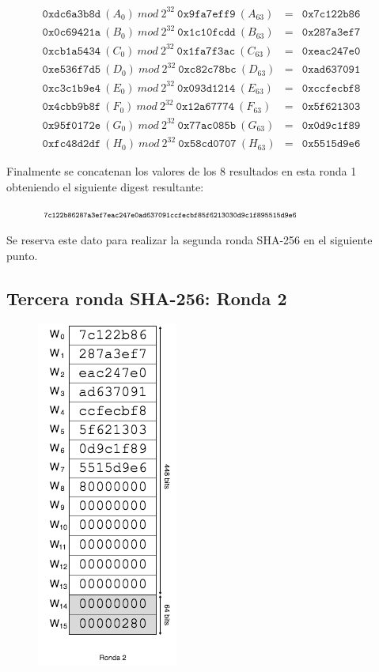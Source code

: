 \documentclass{article}
\begin{document}
    \begin{figure}[H]
    \centering
        $\begin{array}{lll}
            \texttt{0xdc6a3b8d}\ (A_0)\ mod\ 2^{32}\ \texttt{0x9fa7eff9}\ (A_63) & = & \texttt{0x7c122b86} \\
            \texttt{0x0c69421a}\ (B_0)\ mod\ 2^{32}\ \texttt{0x1c10fcdd}\ (B_63) & = & \texttt{0x287a3ef7} \\
            \texttt{0xcb1a5434}\ (C_0)\ mod\ 2^{32}\ \texttt{0x1fa7f3ac}\ (C_63) & = & \texttt{0xeac247e0} \\
            \texttt{0xe536f7d5}\ (D_0)\ mod\ 2^{32}\ \texttt{0xc82c78bc}\ (D_63) & = & \texttt{0xad637091} \\
            \texttt{0xc3c1b9e4}\ (E_0)\ mod\ 2^{32}\ \texttt{0x093d1214}\ (E_63) & = & \texttt{0xccfecbf8} \\
            \texttt{0x4cbb9b8f}\ (F_0)\ mod\ 2^{32}\ \texttt{0x12a67774}\ (F_63) & = & \texttt{0x5f621303} \\
            \texttt{0x95f0172e}\ (G_0)\ mod\ 2^{32}\ \texttt{0x77ac085b}\ (G_63) & = & \texttt{0x0d9c1f89} \\
            \texttt{0xfc48d2df}\ (H_0)\ mod\ 2^{32}\ \texttt{0x58cd0707}\ (H_63) & = & \texttt{0x5515d9e6}
        \end{array}$
    \end{figure}
    
    Finalmente se concatenan los valores de los 8 resultados en esta ronda 1 obteniendo el siguiente digest resultante:
    
    \begin{figure}[H]
    \centering
        $\scriptsize{\texttt{7c122b86287a3ef7eac247e0ad637091ccfecbf85f6213030d9c1f895515d9e6}}$
    \end{figure}
    Se reserva este dato para realizar la segunda ronda SHA-256 en el siguiente punto.
    
    \subsection{Tercera ronda SHA-256: Ronda 2}
    \begin{figure}[H]
    \centering
        \includegraphics[scale=0.59]{img/Bitcoin_block_SHA_256_W0_W15_ronda_2}
    \end{figure}
\end{document}
